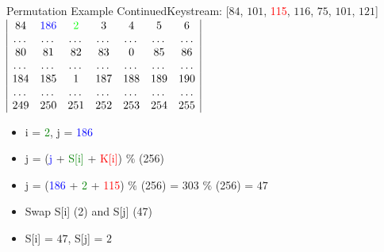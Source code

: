 \documentclass[
	aspectratio=169,	%
	onlytextwidth,		%
	t					%
	]{beamer}
\begin{document}
\begin{frame}{Permutation Example Continued}{Keystream: [$84$, $101$, \textcolor{red} {115}, $116$, $75$, $101$, $121$]}
	$\begin{array}{|ccccccc|}
		84 & \textcolor{blue} {186} & \textcolor{green}{2} & 3 & 4 & 5 & 6 \\
		\dots & \dots & \dots & \dots & \dots & \dots & \dots \\
		80 & 81 & 82 & 83 & 0 & 85 & 86 \\
		\dots & \dots & \dots & \dots & \dots & \dots & \dots \\
		184 & 185 & 1 & 187 & 188 & 189 & 190\\
		\dots & \dots & \dots & \dots & \dots & \dots & \dots \\
		249 & 250 & 251 & 252 & 253 & 254 & 255 \\
	\end{array}$
	\begin{itemize}[<+->]
		\item i = \textcolor{green}{2}, j = \textcolor{blue}{186}
		\item j = (\textcolor{blue} {j} + \textcolor{green}{S[i]} + \textcolor{red}{K[i]}) $\%$ (256)
		\item j = (\textcolor{blue} {186} + \textcolor{green} {2} + \textcolor{red} {115}) $\%$ (256) = 303 $\%$ (256) = $47$
		\item Swap S[i] (2) and S[j] (47)
		\item S[i] = $47$, S[j] = $2$
	\end{itemize}
\end{frame}
\end{document}
